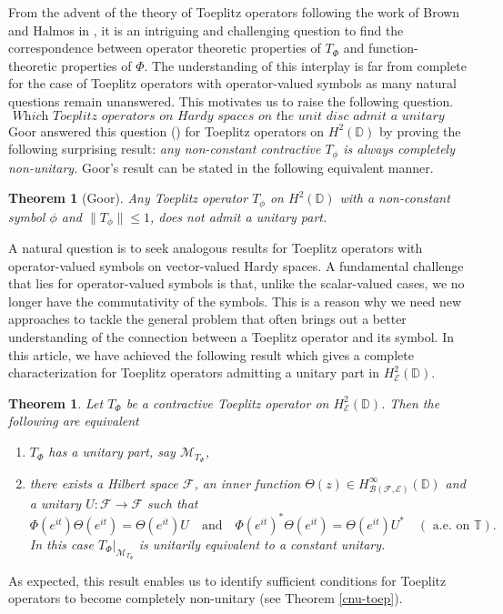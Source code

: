 \documentclass[12pt]{amsart}
\numberwithin{equation}{section}
\newtheorem{thm}[propn]{Theorem}
\newtheorem*{thm*}{Theorem}
\theoremstyle{definition}
\newcommand{\D}{\mathbb{D}}
\newcommand{\T}{\mathbb{T}}
\newcommand{\1}{{\mbox{\bf 1}}}
\newcommand{\clb}{\mathcal{B}}
\newcommand{\cle}{\mathcal{E}}
\newcommand{\clf}{\mathcal{F}}
\newcommand{\clm}{\mathcal{M}}
\newcommand{\raro}{\rightarrow}
\begin{document}
From the advent of the theory of Toeplitz operators following the work of Brown and Halmos in \cite{BH}, it is an intriguing and challenging question to find the correspondence between operator theoretic properties of $T_{\Phi}$ and function-theoretic properties of $\Phi$.  The understanding of this interplay is far from complete for the case of Toeplitz operators with operator-valued symbols as many natural questions remain unanswered. This motivates us to raise the following question.
\[
\textit{ Which Toeplitz operators on Hardy spaces on the unit disc admit a unitary part?}
\]
Goor answered this question (\cite{Goor}) for Toeplitz operators on $H^2(\D)$ by proving the following surprising result: \textit{any non-constant contractive $T_{\phi}$ is always completely non-unitary.}  Goor's result can be stated in the following equivalent manner.
\begin{thm*}[Goor]
Any Toeplitz operator $T_{\phi}$ on $H^2(\D)$ with a non-constant symbol $\phi$ and $\|T_{\phi}\|\leq 1$, does not admit a unitary part.
\end{thm*}
A natural question is to seek analogous results for Toeplitz operators with operator-valued symbols on vector-valued Hardy spaces.  A fundamental challenge that lies for operator-valued symbols is that, unlike the scalar-valued cases, we no longer have the commutativity of the symbols.  This is a reason why we need new approaches to tackle the general problem that often brings out a better understanding of the connection between a Toeplitz operator and its symbol. In this article, we have achieved the following result which gives a complete characterization for Toeplitz operators admitting a unitary part in $H_{\cle}^2(\D)$.
\begin{thm}
Let $T_{\Phi}$ be a contractive Toeplitz operator on $H_{\cle}^2(\D)$.  Then the following are equivalent
\begin{enumerate}
\item[(i)] $T_{\Phi}$ has a unitary part, say $\clm_{T_{\Phi}}$,
\item[(ii)] there exists a Hilbert space $\clf$, an inner function $\Theta(z) \in H_{\clb(\clf,\cle)}^{\infty}(\D)$ and a unitary $U: \clf \raro \clf$ such that
\[
\Phi(e^{it}) \Theta(e^{it}) = \Theta(e^{it}) U \quad \text{and} \quad  \Phi(e^{it})^* \Theta(e^{it}) = \Theta(e^{it}) U^* \quad (\text{ a.e. on }\T).
\]
In this case $T_{\Phi}|_{\clm_{T_{\Phi}}}$ is unitarily equivalent to a constant unitary.
\end{enumerate} 
\end{thm}
As expected, this result enables us to identify sufficient conditions for Toeplitz operators to become completely non-unitary (see Theorem \ref{cnu-toep}).
\end{document}
